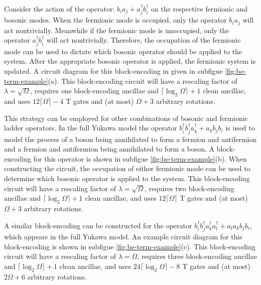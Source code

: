 Consider the action of the operator: $b_i a_j + a_j^\dagger b_i^\dagger$ on the respective fermionic and bosonic modes.
When the fermionic mode is occupied, only the operator $b_i a_j$ will act nontrivially.
Meanwhile if the fermionic mode is unoccupied, only the operator $a_j^\dagger b_i^\dagger$ will act nontrivially.
Therefore, the occupation of the fermionic mode can be used to dictate which bosonic operator should be applied to the system.
After the appropriate bosonic operator is applied, the fermionic system is updated.
A circuit diagram for this block-encoding in given in subfigue \ref{fig:be-term-example}(a).
This block-encoding circuit will have a rescaling factor of $\lambda = \sqrt{\Omega}$, requires one block-encoding ancillae and $\lceil \log_2\Omega \rceil + 1$ clean ancillae, and uses $12 \lceil \Omega \rceil - 4$ T gates and (at most) $\Omega + 3$ arbitrary rotations.

This strategy can be employed for other combinations of bosonic and fermionic ladder operators.
In the full Yukawa model the operator $b_i^\dagger b_j^\dagger a_k^\dagger + a_k b_j b_i$ is used to model the process of a boson being annihilated to form a fermion and antifermion and a fermion and antifermion being annihilated to form a boson.
A block-encoding for this operator is shown in subfigue \ref{fig:be-term-example}(b).
When constructing the circuit, the occupation of either fermionic mode can be used to determine which bosonic operator is applied to the system.
This block-encoding circuit will have a rescaling factor of $\lambda = \sqrt{\Omega}$, requires two block-encoding ancillae and $\lceil \log_2\Omega \rceil + 1$ clean ancillae, and uses $12 \lceil \Omega \rceil$ T gates and (at most) $\Omega + 3$ arbitrary rotations.

A similar block-encoding can be constructed for the operator $b_i^\dagger b_j^\dagger a_k^\dagger a_l^\dagger + a_l a_k b_j b_i$, which appears in the full Yukawa model.
An example circuit diagram for this block-encoding is shown in subfigue \ref{fig:be-term-example}(c).
This block-encoding circuit will have a rescaling factor of $\lambda = \Omega$, requires three block-encoding ancillae and $\lceil \log_2\Omega \rceil + 1$ clean ancillae, and uses $24 \lceil \log_2\Omega \rceil - 8$ T gates and (at most) $2\Omega + 6$ arbitrary rotations.

